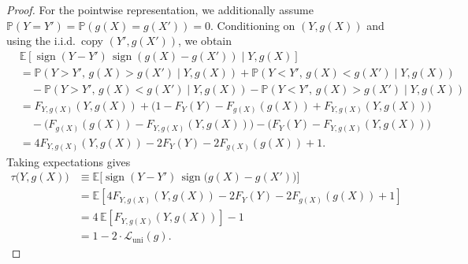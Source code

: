 \documentclass[11pt]{article}
\theoremstyle{plain}
\theoremstyle{plain}
\theoremstyle{plain}
\theoremstyle{plain}
\theoremstyle{plain}
\theoremstyle{plain}
\theoremstyle{plain}
\begin{document}
\begin{proof}
{\color{cairoaddedgreen}
For the pointwise representation, we additionally assume $\mathbb{P}(Y=Y')=\mathbb{P}(g(X)=g(X'))=0$. Conditioning on $(Y,g(X))$ and using the i.i.d.\ copy $(Y',g(X'))$, we obtain
\begin{align*}
&\mathbb{E}\!\left[\operatorname{sign}(Y-Y')\,\operatorname{sign}(g(X)-g(X')) \mid Y,g(X)\right] \\
&= \mathbb{P}(Y>Y',\,g(X)>g(X') \mid Y,g(X)) + \mathbb{P}(Y<Y',\,g(X)<g(X') \mid Y,g(X)) \\
&\quad - \mathbb{P}(Y>Y',\,g(X)<g(X') \mid Y,g(X)) - \mathbb{P}(Y<Y',\,g(X)>g(X') \mid Y,g(X)) \\
&= F_{Y,g(X)}(Y,g(X)) + \big(1-F_Y(Y)-F_{g(X)}(g(X))+F_{Y,g(X)}(Y,g(X))\big) \\
&\quad - \big(F_{g(X)}(g(X))-F_{Y,g(X)}(Y,g(X))\big) - \big(F_Y(Y)-F_{Y,g(X)}(Y,g(X))\big) \\
&= 4F_{Y,g(X)}(Y,g(X))-2F_Y(Y)-2F_{g(X)}(g(X))+1.
\end{align*}
Taking expectations gives
\begin{align*}
    \tau\big(Y,g(X)\big)
    &\equiv
    \mathbb{E}\!\Big[\operatorname{sign}(Y-Y')\,\operatorname{sign}\!\big(g(X)-g(X')\big)\Big] \\
    &= \mathbb{E}\!\left[4F_{Y,g(X)}(Y,g(X))-2F_Y(Y)-2F_{g(X)}(g(X))+1\right] \\
    &= 4\,\mathbb{E}\!\left[F_{Y,g(X)}(Y,g(X))\right]-1 \\
    &= 1-2\cdot\mathcal{L}_{\mathrm{uni}}(g) .
\end{align*}
}



\end{proof}
\end{document}
